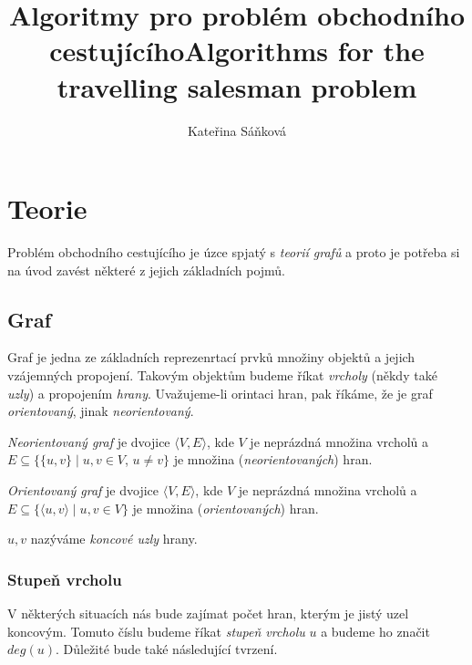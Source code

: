 \documentclass[
  biblatex,
  figures=false,
  glossaries,
  index
]{kidiplom}
\title{Algoritmy pro problém obchodního cestujícího}
\title[english]{Algorithms for the travelling salesman problem}
\author{Kateřina Sáňková}
\begin{document}
\maketitle



\newcommand{\BibLaTeX}{\textsc{Bib}\LaTeX}

\section{Teorie}
Problém obchodního cestujícího je úzce spjatý s \textit{teorií grafů} a proto je potřeba si na úvod zavést některé z jejich základních pojmů.

\subsection{Graf}
Graf je jedna ze základních reprezenrtací prvků množiny objektů a jejich vzájemných propojení. Takovým objektům budeme říkat \textit{vrcholy} (někdy také \textit{uzly}) a propojením \textit{hrany}. Uvažujeme-li orintaci hran, pak říkáme, že je graf \textit{orientovaný}, jinak \textit{neorientovaný}.

\begin{definition}
\textit{Neorientovaný graf} je dvojice $\langle V, E \rangle$, kde $V$ je neprázdná množina vrcholů a $E \subseteq \{\{u, v\} \mid u, v \in V$, $u \neq v \}$ je množina (\textit{neorientovaných}) hran.
\end{definition}

\begin{definition}
\textit{Orientovaný graf} je dvojice $\langle V, E \rangle$, kde $V$ je neprázdná množina vrcholů a $E \subseteq \{ \langle u, v \rangle \mid u, v \in V\}$ je množina (\textit{orientovaných}) hran.
\end{definition}

$u, v$ nazýváme \textit{koncové uzly} hrany.

\subsubsection{Stupeň vrcholu} 
V některých situacích nás bude zajímat počet hran, kterým je jistý uzel koncovým. Tomuto číslu budeme říkat \textit{stupeň vrcholu} $u$ a budeme ho značit $deg(u)$. Důležité bude také následující tvrzení.
\end{document}
